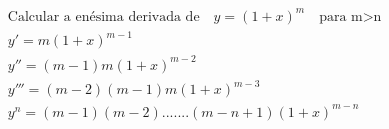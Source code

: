 \begin{ex}
\begin{align}
&\text{Calcular a enésima derivada de} \quad y=(1+x)^m \quad \text{para m>n}\nonumber\\
&y'=m(1+x)^{m-1}\nonumber\\
&y''=(m-1)m(1+x)^{m-2}\nonumber\\
&y'''=(m-2)(m-1)m(1+x)^{m-3}\nonumber\\
&y^{n}=(m-1)(m-2).......(m-n+1)(1+x)^{m-n}\nonumber
\end{align}
\end{ex}